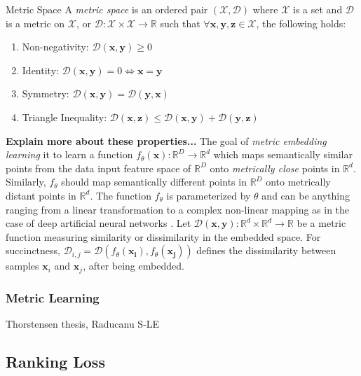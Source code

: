  \theoremstyle{definition}
 \begin{definition}{Metric Space}
 A \textit{metric space} is an ordered pair $(\mathcal{X},\mathcal{D})$ where $\mathcal{X}$ is a set and $\mathcal{D}$ is a metric on $\mathcal{X}$, or $\mathcal{D}:\mathcal{X} \times \mathcal{X} \rightarrow \mathbb{R}$ such that $\forall \bm{x},\bm{y},\bm{z}\in\mathcal{X}$, the following holds:

 \end{definition}
 	\begin{enumerate}
	\item Non-negativity: $\mathcal{D}(\bm{x},\bm{y}) \geq 0$
	\item Identity: $\mathcal{D}(\bm{x},\bm{y}) = 0 \iff \bm{x} = \bm{y} $
	\item Symmetry: $\mathcal{D}(\bm{x},\bm{y}) = \mathcal{D}(\bm{y},\bm{x})$
	\item Triangle Inequality:  $\mathcal{D}(\bm{x},\bm{z}) \leq \mathcal{D}(\bm{x},\bm{y}) + \mathcal{D}(\bm{y},\bm{z})$
	\end{enumerate}


\textbf{Explain more about these properties...} \newline
The goal of \textit{metric embedding learning} it to learn a function $f_{\theta}(\bm{x}):\mathbb{R}^{D} \rightarrow \mathbb{R}^{d}$ which maps semantically similar points from the data input feature space of $\mathbb{R}^{D}$ onto \textit{metrically close} points in $\mathbb{R}^{d}$.  Similarly, $f_{\theta}$ should map semantically different points in $\mathbb{R}^{D}$ onto metrically distant points in $\mathbb{R}^{d}$.  The function $f_{\theta}$ is parameterized by $\theta$ and can be anything ranging from a linear transformation to a complex non-linear mapping as in the case of deep artificial neural networks \citep{Hermans2017DefenseTripletLoss}.  Let $\mathcal{D}(\bm{x},\bm{ y}): \mathbb{R}^{d} \times \mathbb{R}^{d} \rightarrow \mathbb{R}$ be a metric function measuring similarity or dissimilarity in the embedded space.  For succinctness, $\mathcal{D}_{i,j} = \mathcal{D}(f_{\theta}(\bm{x_{i}}),f_{\theta}(\bm{x_{j}}))$
defines the dissimilarity between samples $\bm{x}_{i}$ and $\bm{x}_{j}$, after being embedded.

\subsubsection{Metric Learning}
Thorstensen thesis, Raducanu S-LE

	\subsection{Ranking Loss}
	
